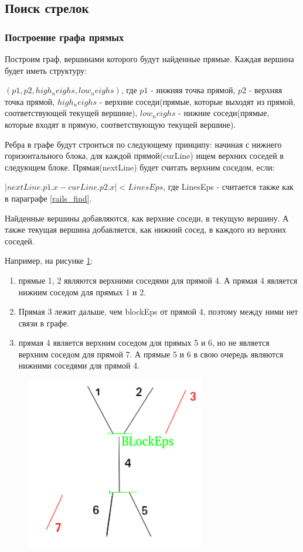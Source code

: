 \subsection{Поиск стрелок}
\subsubsection{Построение графа прямых}
\label{line_graph}

Построим граф, вершинами которого будут найденные прямые. Каждая вершина будет иметь структуру: 

$(p1, p2, high_neighs, low_neighs)$, где $p1$ - нижняя точка прямой, $p2$ - верхняя точка прямой, $high_neighs$ - верхние соседи(прямые, которые выходят из прямой, соответствующей текущей вершине), $low_neighs$ - нижние соседи(прямые, которые входят в прямую, соответствующую текущей вершине). 

Ребра в графе будут строиться по следующему принципу: начиная с нижнего горизонтального блока, для каждой прямой(curLine) ищем верхних соседей в следующем блоке. Прямая(nextLine) будет считать верхним соседом, если:

$|nextLine.p1.x - curLine.p2.x| < LinesEps$, 
где LinesEps - считается также как в параграфе \ref{rails_find}.

Найденные вершины добавляются, как верхние соседи, в текущую вершину. А также текущая вершина добавляется, как нижний сосед, в каждого из верхних соседей.

Например, на рисунке \ref{fig:neighscheck}:
\begin{enumerate}
	\item прямые 1, 2 являются верхними соседями для прямой 4. А прямая 4 является нижним соседом для прямых 1 и 2.
	\item Прямая 3 лежит дальше, чем blockEps от прямой 4, поэтому между ними нет связи в графе.
	\item прямая 4 является верхним соседом для прямых 5 и 6, но не является верхним соседом для прямой 7. А прямые 5 и 6 в свою очередь являются нижними соседями для прямой 4.
\end{enumerate}
\begin{figure}[!h]
	\centering
	\includegraphics[width=0.7\textwidth]{pictures/neighs_check}
	\caption[Создание ребер]{}
	\label{fig:neighscheck}
\end{figure}


